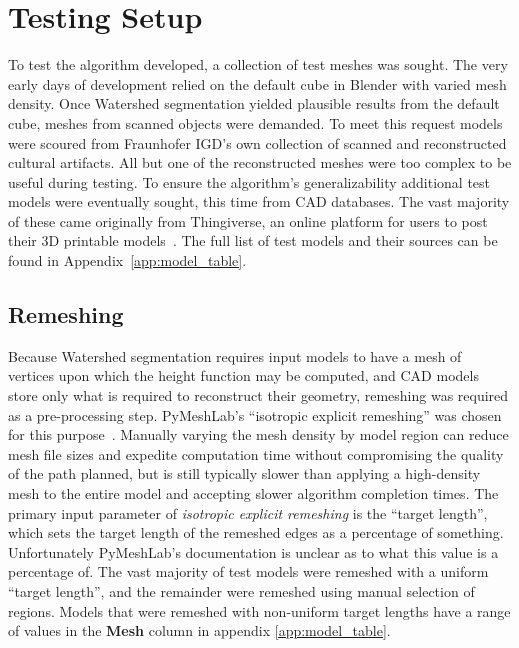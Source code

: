 
\section{Testing Setup}

To test the algorithm developed, a collection of test meshes was sought.
The very early days of development relied on the default cube in Blender with varied mesh density.
Once Watershed segmentation yielded plausible results from the default cube, meshes from scanned objects were demanded.
To meet this request models were scoured from Fraunhofer IGD's own collection of scanned and reconstructed cultural artifacts.
All but one of the reconstructed meshes were too complex to be useful during testing.
To ensure the algorithm's generalizability additional test models were eventually sought, this time from CAD databases.
The vast majority of these came originally from Thingiverse, an online platform for users to post their 3D printable models~\cite{Thingiverse}.
The full list of test models and their sources can be found in Appendix~\ref{app:model_table}.

\subsection{Remeshing}
Because Watershed segmentation requires input models to have a mesh of vertices upon which the height function may be computed, and CAD models store only what is required to reconstruct their geometry, remeshing was required as a pre-processing step.
PyMeshLab's ``isotropic explicit remeshing'' was chosen for this purpose~\cite{PyMeshLab}.
Manually varying the mesh density by model region can reduce mesh file sizes and expedite computation time without compromising the quality of the path planned, but is still typically slower than applying a high-density mesh to the entire model and accepting slower algorithm completion times.
The primary input parameter of \textit{isotropic explicit remeshing} is the ``target length'', which sets the target length of the remeshed edges as a percentage of something.
Unfortunately PyMeshLab's documentation is unclear as to what this value is a percentage of.
The vast majority of test models were remeshed with a uniform ``target length'', and the remainder were remeshed using manual selection of regions.
Models that were remeshed with non-uniform target lengths have a range of values in the \textbf{Mesh} column in appendix \ref{app:model_table}.

